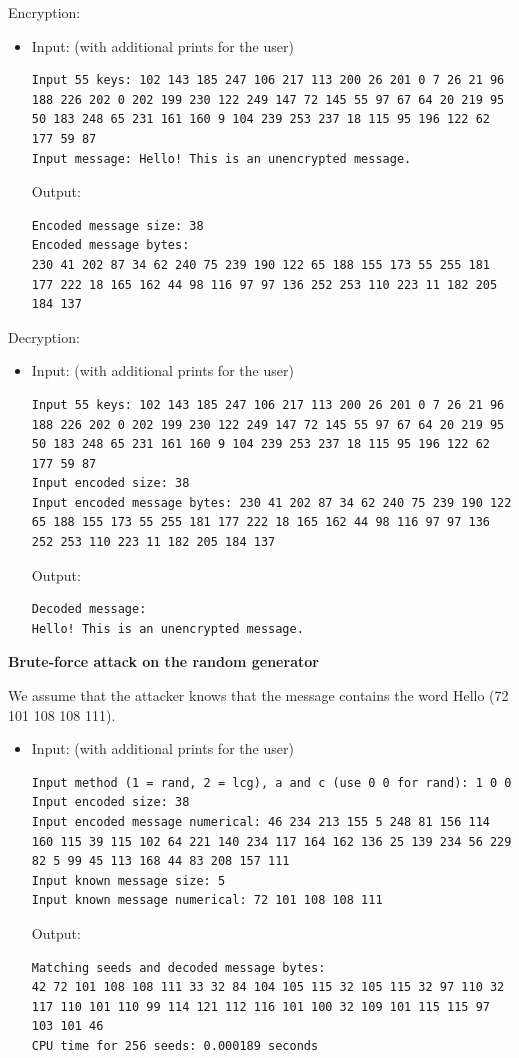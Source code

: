 \documentclass[a4paper,10pt]{article}
\begin{document}
Encryption:
\begin{itemize}
\item Input: (with additional prints for the user)
\begin{lstlisting}[style = stdio]
Input 55 keys: 102 143 185 247 106 217 113 200 26 201 0 7 26 21 96 188 226 202 0 202 199 230 122 249 147 72 145 55 97 67 64 20 219 95 50 183 248 65 231 161 160 9 104 239 253 237 18 115 95 196 122 62 177 59 87
Input message: Hello! This is an unencrypted message.
\end{lstlisting}

  Output:
\begin{lstlisting}[style = stdio]
Encoded message size: 38
Encoded message bytes:
230 41 202 87 34 62 240 75 239 190 122 65 188 155 173 55 255 181 177 222 18 165 162 44 98 116 97 97 136 252 253 110 223 11 182 205 184 137
\end{lstlisting}
\end{itemize}
Decryption:
\begin{itemize}
\item Input: (with additional prints for the user)
\begin{lstlisting}[style = stdio]
Input 55 keys: 102 143 185 247 106 217 113 200 26 201 0 7 26 21 96 188 226 202 0 202 199 230 122 249 147 72 145 55 97 67 64 20 219 95 50 183 248 65 231 161 160 9 104 239 253 237 18 115 95 196 122 62 177 59 87
Input encoded size: 38
Input encoded message bytes: 230 41 202 87 34 62 240 75 239 190 122 65 188 155 173 55 255 181 177 222 18 165 162 44 98 116 97 97 136 252 253 110 223 11 182 205 184 137
\end{lstlisting}

  Output:
\begin{lstlisting}[style = stdio]
Decoded message: 
Hello! This is an unencrypted message.
\end{lstlisting}
\end{itemize}

\textbf{Brute-force attack on the random generator}

We assume that the attacker knows that the message contains the word Hello (72 101 108 108 111).
\begin{itemize}
\item Input: (with additional prints for the user)
\begin{lstlisting}[style = stdio]
Input method (1 = rand, 2 = lcg), a and c (use 0 0 for rand): 1 0 0
Input encoded size: 38
Input encoded message numerical: 46 234 213 155 5 248 81 156 114 160 115 39 115 102 64 221 140 234 117 164 162 136 25 139 234 56 229 82 5 99 45 113 168 44 83 208 157 111
Input known message size: 5
Input known message numerical: 72 101 108 108 111
\end{lstlisting}

  Output:
\begin{lstlisting}[style = stdio]
Matching seeds and decoded message bytes:
42 72 101 108 108 111 33 32 84 104 105 115 32 105 115 32 97 110 32 117 110 101 110 99 114 121 112 116 101 100 32 109 101 115 115 97 103 101 46
CPU time for 256 seeds: 0.000189 seconds
\end{lstlisting}
\end{itemize}
\end{document}

